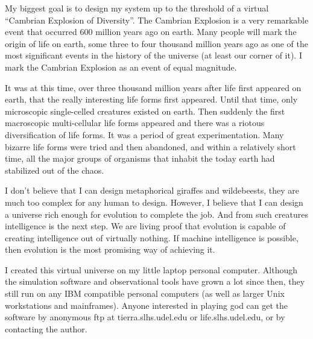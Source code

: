 My biggest goal is to design my system up to the threshold of a virtual
``Cambrian Explosion of Diversity''.  The Cambrian Explosion is a very
remarkable event that occurred 600 million years ago on earth.  Many people
will mark the origin of life on earth, some three to four thousand million
years ago as one of the most significant events in the history of the
universe (at least our corner of it).  I mark the Cambrian Explosion as an
event of equal magnitude.

It was at this time, over three thousand million years after life first
appeared on earth, that the really interesting life forms first appeared.
Until that time, only microscopic single-celled creatures existed on earth.
Then suddenly the first macroscopic multi-cellular life forms appeared and
there was a riotous diversification of life forms.  It was a period of great
experimentation.  Many bizarre life forms were tried and then abandoned, and
within a relatively short time, all the major groups of organisms that inhabit
the today earth had stabilized out of the chaos.

I don't believe that I can design metaphorical giraffes and wildebeests, they
are much too complex for any human to design.  However, I believe that I can
design a universe rich enough for evolution to complete the job.  And from
such creatures intelligence is the next step.  We are living proof that
evolution is capable of creating intelligence out of virtually nothing.
If machine intelligence is possible, then evolution is the most promising
way of achieving it.

I created this virtual universe on my little laptop personal computer.
Although the simulation software and observational tools have grown a lot
since then, they still run on any IBM compatible personal computers (as
well as larger Unix workstations and mainframes).  Anyone interested in
playing god can get the software by anonymous ftp at tierra.slhs.udel.edu
or life.slhs.udel.edu, or by contacting the author.




